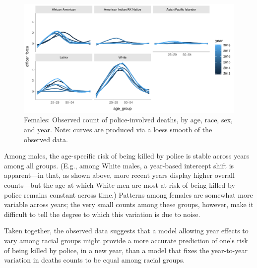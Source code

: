 \documentclass{article}
\begin{document}
\begin{figure}
	\centering
	\includegraphics[width = \linewidth]{vis/fig_a3.pdf}
	\caption{Females: Observed count of police-involved deaths, by age, race, sex, and year. Note: curves are produced via a loess smooth of the observed data.}
	\label{fig:a3}
\end{figure}

Among males, the age-specific risk of being killed by police is stable across years among all groups. (E.g., among White males, a year-based intercept shift is apparent---in that, as shown above, more recent years display higher overall counts---but the age at which White men are most at risk of being killed by police remains constant across time.) Patterns among females are somewhat more variable across years; the very small counts among these groups, however, make it difficult to tell the degree to which this variation is due to noise.

Taken together, the observed data suggests that a model allowing year effects to vary among racial groups might provide a more accurate prediction of one's risk of being killed by police, in a new year, than a model that fixes the year-to-year variation in deaths counts to be equal among racial groups. 
\end{document}
